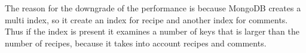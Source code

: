 \documentclass[a4paper]{report}
\begin{document}
\noindent The reason for the downgrade of the performance is because MongoDB creates a multi index, so it create an index for recipe and another index for comments. Thus if the index is present it examines a number of keys that is larger than the number of recipes, because it takes into account recipes and comments.

\end{document}
